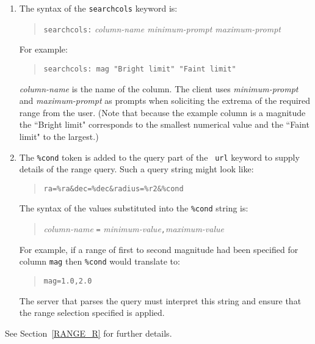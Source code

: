 \documentclass[twoside,11pt]{article}
\renewcommand{\_}{\texttt{\symbol{95}}}
\begin{document}
\begin{enumerate}

  \item The syntax of the {\tt search\_cols} keyword is:

  \begin{quote}
   {\tt search\_cols:} {\it column-name minimum-prompt maximum-prompt}
  \end{quote}

   For example:

  \begin{quote}
   {\tt search\_cols: mag "Bright limit" "Faint limit"}
  \end{quote}

   {\it column-name}\/ is the name of the column.  The client uses
   {\it minimum-prompt}\/ and {\it maximum-prompt}\/ as prompts when
   soliciting the extrema of the required range from the user.  (Note
   that because the example column is a magnitude the ``Bright limit"
   corresponds to the smallest numerical value and the ``Faint limit"
   to the largest.)

  \item The {\tt \%cond} token is added to the query part of the {\tt
   url} keyword to supply details of the range query.  Such a query
   string might look like:

  \begin{quote}
  \verb-ra=%ra&dec=%dec&radius=%r2&%cond-
  \end{quote}

   The syntax of the values substituted into the {\tt \%cond} string is:

  \begin{quote}
   {\it column-name}\/ {\tt =} {\it minimum-value}{\tt ,}{\it maximum-value}
  \end{quote}

   For example, if a range of first to second magnitude had been specified
   for column {\tt mag} then {\tt \%cond} would translate to:

  \begin{quote}
   {\tt mag=1.0,2.0}
  \end{quote}

   The server that parses the query must interpret this string and
   ensure that the range selection specified is applied.

\end{enumerate}

See Section~\ref{RANGE_R} for further details.
\end{document}
